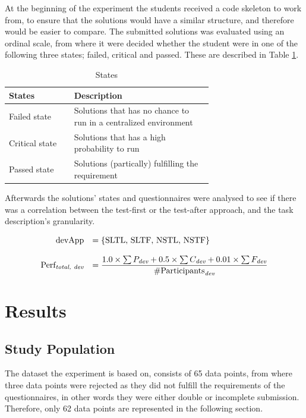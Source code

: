 \documentclass{sig-alternate-05-2015}
\begin{document}
At the beginning of the experiment the students received a code skeleton to work from, to ensure that the solutions would have a similar structure, and therefore would be easier to compare. The submitted solutions was evaluated using an ordinal scale, from where it were decided whether the student were in one of the following three states; failed, critical and passed. These are described in Table \ref{StatesTable}.

\begin{table}[!ht]
\centering
\caption{States}
\label{StatesTable}
\begin{tabular}{|l|p{0.68\linewidth}|}
\hline
\textbf{States} & \textbf{Description} \\
\hline
\hline
Failed state & Solutions that has no chance to run in a centralized environment \\
Critical state & Solutions that has a high probability to run \\
Passed state & Solutions (partically) fulfilling the  requirement \\
\hline
\end{tabular}
\end{table}

Afterwards the solutions' states and questionnaires were analysed to see if there was a correlation between the test-first or the test-after approach, and the task description's granularity.

\[
\begin{array}{rl}
\text{devApp} &= \{\text{SLTL, SLTF, NSTL, NSTF}\} \\
& \\
\text{Perf}_{\emph{total, dev}} &= \dfrac{1.0\times \sum{P_{\emph{dev}}}+0.5\times \sum {C_{\emph{dev}}}+0.01\times \sum{ F_{\emph{dev}}}}{\# \text{Participants}_{\emph{dev}}}
\end{array}
\]

\section{Results}

\subsection{Study Population}
\label{DemograpichInformation}
The dataset the experiment is based on, consists of 65 data points, from where three data points were rejected as they did not fulfill the requirements of the questionnaires, in other words they were either double or incomplete submission. Therefore, only 62 data points are represented in the following section.
\end{document}
